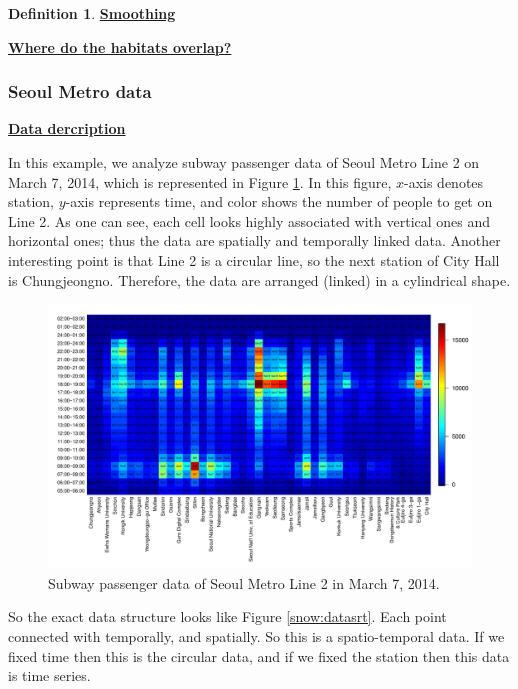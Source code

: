 \documentclass[preprint, review, 12pt]{article}
\theoremstyle{definition}
\newtheorem{dfn}{Definition}
\theoremstyle{remark}
\begin{document}
\begin{dfn}
\noindent\textbf{\underline{Smoothing}}

\noindent\textbf{\underline{Where do the habitats overlap?}}

\subsubsection{Seoul Metro data}
\noindent\textbf{\underline{Data dercription}}

In this example, we analyze subway passenger data of Seoul Metro Line 2 on March 7, 2014, which is represented in Figure \ref{snow:subway_in_0}. In this figure, $x$-axis denotes station, $y$-axis represents time, and color shows the number of people to get on Line 2. As one can see, each cell looks highly associated with vertical ones and horizontal ones; thus the data are spatially and temporally linked data. Another interesting point is that Line 2 is a circular line, so the next station of City Hall is Chungjeongno. Therefore, the data are arranged (linked) in a cylindrical shape.

\begin{figure}
	\centering
	\includegraphics[width=1.05\textwidth]{Fig/In_data.pdf}
	\vspace{-13mm}
	\caption{Subway passenger data of Seoul Metro Line 2 in March 7, 2014.}
	\label{snow:subway_in_0}
\end{figure}	

So the exact data structure looks like Figure \ref{snow:datasrt}. Each point connected with temporally, and spatially. So this is a spatio-temporal data. If we fixed time then this is the circular data, and if we fixed the station then this data is time series. 


\end{dfn}
\end{document}
